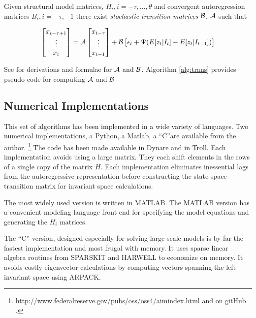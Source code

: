 \documentclass[12pt]{article}
\begin{document}
Given structural model matrices, $H_i, i=-\tau,\ldots,\theta$ 
and 
 convergent autoregression matrices $B_i,i=-\tau,-1$
there exist  
{\em stochastic transition
matrices\/} $\mathcal{B}$, $\mathcal{A}$ such that




  

\begin{gather}
\begin{bmatrix}
 x_{t-\tau+1}\\\vdots\\x_{t}
\end{bmatrix}= 
\sTransA%
\begin{bmatrix}
 x_{t-\tau}\\\vdots\\x_{t-1}
\end{bmatrix} +
\sTransB%
\begin{bmatrix}\epsilon_{t} +
\Psi  (E[z_t|I_t]-E[z_t|I_{t-1}])
\end{bmatrix}
\end{gather}


See \cite{anderson10} for  derivations and formulae for $\mathcal{A}$
and $\mathcal{B}$.
Algorithm \ref{alg:trans} provides pseudo code for computing $\mathcal{A}$ and $\mathcal{B}$




\subsection{Numerical Implementations}
\label{sec:imple}

This set of algorithms has been implemented in a wide variety of languages.
Two numerical implementations, a Python, a  Matlab, a ``C''are available from the author. \footnote{\url{http://www.federalreserve.gov/pubs/oss/oss4/aimindex.html} and on gitHub .}   The code has been made available in Dynare and in Troll.
Each implementation avoids using a large matrix.
They each  shift elements in the
rows of a single copy of the matrix $H$. 
Each implementation
eliminates inessential lags from the autoregressive representation before
constructing the state space transition matrix for invariant space 
calculations.  



The most widely used version is written in MATLAB. The MATLAB version
has a convenient modeling language front end for specifying the model
equations and generating the $H_i$ matrices. 

The ``C'' version, designed especially for solving large scale
models is by far the fastest implementation and most frugal with memory.
It uses sparse linear algebra routines from SPARSKIT\cite{saad94} and
HARWELL\cite{nag95} to economize on
memory. It avoids costly eigenvector calculations by
computing vectors spanning the left invariant space using ARPACK\cite{lehoucq96}.
\end{document}
